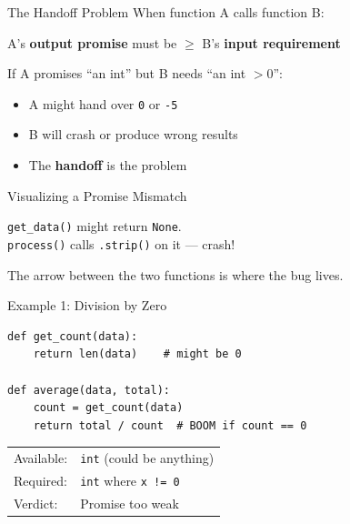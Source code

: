 \documentclass[aspectratio=169,10pt]{beamer}
\newcommand{\warn}[1]{\begin{center}
  \colorbox{warnbg}{\parbox{0.88\textwidth}{\centering\small #1}}\end{center}}
\begin{document}
\begin{frame}{The Handoff Problem}
When function A calls function B:
\vspace{0.5em}
\begin{center}
A's \textbf{output promise} must be $\ge$ B's \textbf{input requirement}
\end{center}
\vspace{0.5em}
If A promises ``an int'' but B needs ``an int $> 0$'':
\begin{itemize}
  \item A might hand over \texttt{0} or \texttt{-5}
  \item B will crash or produce wrong results
  \item The \textbf{handoff} is the problem
\end{itemize}
\end{frame}

\begin{frame}{Visualizing a Promise Mismatch}
\begin{center}
\end{center}
\vspace{0.3em}
\texttt{get\_data()} might return \texttt{None}.\\
\texttt{process()} calls \texttt{.strip()} on it --- crash!
\warn{The arrow between the two functions is where the bug lives.}
\end{frame}

\begin{frame}[fragile]{Example 1: Division by Zero}
\begin{lstlisting}
def get_count(data):
    return len(data)    # might be 0

def average(data, total):
    count = get_count(data)
    return total / count  # BOOM if count == 0
\end{lstlisting}
\vspace{0.3em}
\begin{tabular}{@{}ll@{}}
Available: & \texttt{int} (could be anything) \\
Required:  & \texttt{int} where \texttt{x != 0} \\
Verdict:   & \textcolor{danger}{Promise too weak} \\
\end{tabular}
\end{frame}
\end{document}
